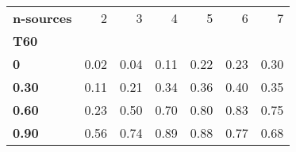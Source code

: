 \begin{tabular}{lrrrrrr}
\toprule
\textbf{n-sources} &    2 &    3 &    4 &    5 &    6 &    7 \\
\textbf{T60 } &      &      &      &      &      &      \\
\midrule
\textbf{0   } & 0.02 & 0.04 & 0.11 & 0.22 & 0.23 & 0.30 \\
\textbf{0.30} & 0.11 & 0.21 & 0.34 & 0.36 & 0.40 & 0.35 \\
\textbf{0.60} & 0.23 & 0.50 & 0.70 & 0.80 & 0.83 & 0.75 \\
\textbf{0.90} & 0.56 & 0.74 & 0.89 & 0.88 & 0.77 & 0.68 \\
\bottomrule
\end{tabular}
